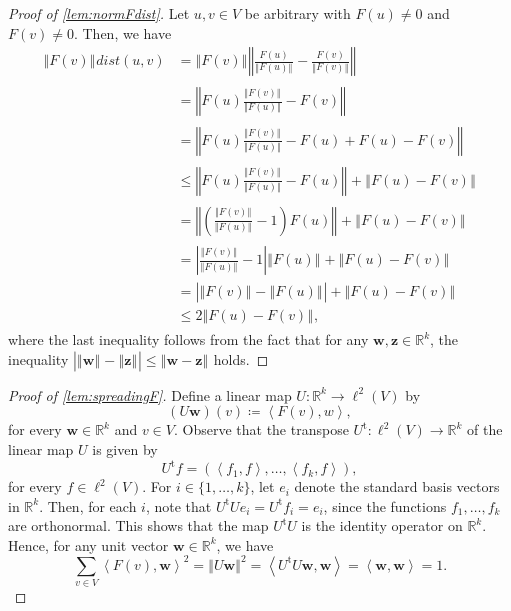 \documentclass[12pt,a4paper,bold]{thesis}
\theoremstyle{definition}
\newcommand*{\map}[3]{#1 \colon #2 \to #3}
\newcommand*{\abs}[1]{\left\vert #1 \right\vert}
\newcommand*{\ip}[2]{\left\langle #1 , #2 \right\rangle}
\newcommand*{\norm}[2][]{\left\Vert #2 \right\Vert_{#1}}
\begin{document}
\begin{proof}[Proof of \cref{lem:normFdist}]
    Let $u, v \in V$ be arbitrary with $F(u) \neq 0$ and $F(v) \neq 0$. Then, we have
    \begin{align*}
        \norm{F(v)} dist(u,v) 
        & = 
        \norm{F(v)} \norm{\frac{F(u)}{\norm{F(u)}} - \frac{F(v)}{\norm{F(v)}}}
        \\
        & =
        \norm{F(u) \frac{\norm{F(v)}}{\norm{F(u)}} - F(v)}
        \\
        & =
        \norm{F(u) \frac{\norm{F(v)}}{\norm{F(u)}} - F(u) + F(u) -  F(v)}
        \\
        & \leq 
        \norm{F(u) \frac{\norm{F(v)}}{\norm{F(u)}} - F(u)} + \norm{F(u) -  F(v)}
        \\
        & =
        \norm{\left(\frac{\norm{F(v)}}{\norm{F(u)}} - 1\right) F(u)} + \norm{F(u) -  F(v)}
        \\
        & =
        \abs{\frac{\norm{F(v)}}{\norm{F(u)}} - 1} \norm{F(u)} + \norm{F(u) -  F(v)}
        \\
        & =
        \abs{\norm{F(v)} - \norm{F(u)}} + \norm{F(u) -  F(v)}
        \\
        & \leq
        2 \norm{F(u) -  F(v)},
    \end{align*}
    where the last inequality follows from the fact that for any 
    $\mathbf{w}, \mathbf{z} \in \mathbb{R}^k$, the inequality 
    $\abs{\norm{\mathbf{w}} - \norm{\mathbf{z}}} \leq \norm{\mathbf{w} - \mathbf{z}}$ holds.
\end{proof}

\begin{proof}[Proof of \cref{lem:spreadingF}]
    Define a linear map $\map{U}{\mathbb{R}^k}{\ell^2(V)}$ by
    \begin{equation*}
        (U \mathbf{w})(v) \coloneq \ip{F(v)}{w},
    \end{equation*}  
    for every $\mathbf{w} \in \mathbb{R}^k$ and $v \in V$.
    Observe that the transpose $\map{U^\mathrm{t}}{\ell^2(V)}{\mathbb{R}^k}$ of 
    the linear map $U$ is given by
    \begin{equation*}
        U^\mathrm{t} f = (\ip{f_1}{f}, \dots, \ip{f_k}{f}),
    \end{equation*}
    for every $f \in \ell^2(V)$. For $i \in \{1, \dots, k\}$, let $e_i$ denote 
    the standard basis vectors in $\mathbb{R}^k$. Then, for each $i$, note that 
    $U^\mathrm{t}U e_i = U^\mathrm{t} f_i = e_i$, since the functions $f_1, \dots, f_k$ 
    are orthonormal. This shows that the map $U^\mathrm{t}U$ is the identity
    operator on $\mathbb{R}^k$. Hence, for any unit vector $\mathbf{w} \in \mathbb{R}^k$, 
    we have
    \begin{equation*}
        \sum_{v \in V} \ip{F(v)}{\mathbf{w}}^2 = \norm{U \mathbf{w}}^2 
        = \ip{U^\mathrm{t}U \mathbf{w}}{\mathbf{w}} = \ip{\mathbf{w}}{\mathbf{w}} = 1. 
    \end{equation*}
\end{proof}
\end{document}
